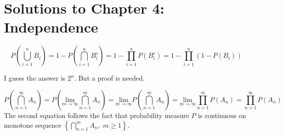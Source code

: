 \section{Solutions to Chapter 4: Independence}
\label{sec:solutions-chapter-4}

\setcounter{Lcount}{0}
\begin{list}{4.6.}{}
\item
  \[
    P\left(\bigcup\limits_{i=1}^nB_i\right)
    = 1 - P\left(\bigcap\limits_{i = 1}^nB_i^c\right)
    = 1 - \prod\limits_{i = 1}^n P\left(B_i^c\right)
    = 1 - \prod\limits_{i = 1}^n\left(1 - P\left(B_i\right)\right)
  \]
  
\item {\color{red}I guess the answer is $2^n$. But a proof is needed.}
  
\item
  \[
    P\left(\bigcap\limits_{n = 1}^\infty A_n\right)
    = P\left(\underset{m\rightarrow\infty}{\mathrm{lim}}\bigcap\limits_{n = 1}^m A_n\right)
    = \underset{m\rightarrow\infty}{\mathrm{lim}}P\left(\bigcap\limits_{n = 1}^mA_n\right)
    = \underset{m\rightarrow\infty}{\mathrm{lim}}\prod\limits_{n=1}^mP\left(A_n\right)
    = \prod\limits_{n=1}^\infty P\left(A_n\right)
  \]
  The second equation follows the fact that probability measure $P$ is continuous on monotone sequence $\left\{\bigcap\limits_{n=1}^mA_n,\;m\geq1\right\}$.
\end{list}

\clearpage{}

